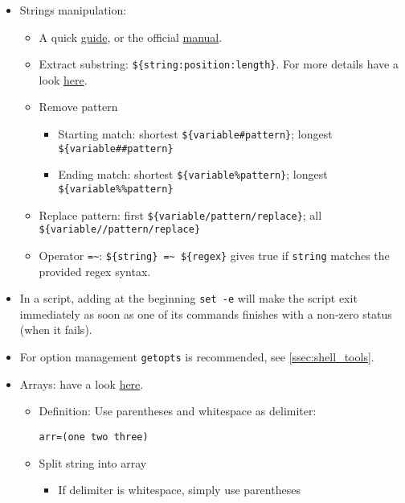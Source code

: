\documentclass[a4paper,12pt,%
              final%
              ]{article}
\begin{document}
\begin{itemize}
\begin{itemize}
    \end{itemize}
  \item Strings manipulation:
    \begin{itemize}
      \item A quick \href{https://sookocheff.com/post/bash/bash-string-operators/}{guide}, or the official \href{https://www.gnu.org/software/bash/manual/html_node/Shell-Parameter-Expansion.html}{manual}.
      \item Extract substring: \verb|${string:position:length}|. For more details have a look \href{https://stackoverflow.com/questions/1405611/how-to-extract-the-first-two-characters-of-a-string-in-shell-scripting}{here}.
      \item Remove pattern
        \begin{itemize}
          \item Starting match: shortest \verb|${variable#pattern}|; longest \verb|${variable##pattern}|
          \item Ending match: shortest \verb|${variable%pattern}|; longest \verb|${variable%%pattern}|
        \end{itemize}
      \item Replace pattern: first \verb|${variable/pattern/replace}|; all \verb|${variable//pattern/replace}|
      \item Operator \verb|=~|: \verb|${string} =~ ${regex}| gives true if \verb|string| matches the provided regex syntax.
    \end{itemize}
  \item In a script, adding at the beginning \verb|set -e| will make the script exit immediately as soon as one of its commands finishes with a non-zero status (when it fails).
  \item For option management \verb|getopts| is recommended, see \autoref{ssec:shell_tools}.
  \item Arrays: have a look \href{https://opensource.com/article/18/5/you-dont-know-bash-intro-bash-arrays}{here}.
    \begin{itemize}
      \item Definition: Use parentheses and whitespace as delimiter:
\begin{verbatim}
arr=(one two three)
\end{verbatim}
      \item Split string into array
        \begin{itemize}
          \item If delimiter is whitespace, simply use parentheses

\end{itemize}
\end{itemize}
\end{itemize}
\end{document}
